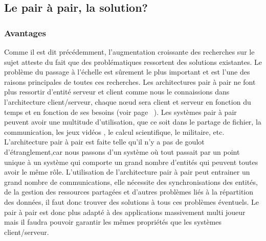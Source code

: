 	\subsection{Le pair à pair, la solution?}
		\subsubsection{Avantages}
	Comme il est dit précédemment, l'augmentation croissante des recherches sur le sujet atteste du fait que des problématiques ressortent des solutions existantes. Le problème du passage à l'échelle est sûrement le plus important et est l'une des raisons principales de toutes ces recherches. Les architectures pair à pair ne font plus ressortir d'entité serveur et client comme nous le connaissions dans l'architecture client/serveur, chaque nœud sera client et serveur en fonction du temps et en fonction de ses besoins (voir page ~\pageref{P2P/ClServ}). Les systèmes pair à pair peuvent avoir une multitude d'utilisation, que ce soit dans le partage de fichier, la communication, les jeux vidéos , le calcul scientifique, le militaire, etc. \\
	L'architecture pair à pair est faite telle qu'il n'y a pas de goulot d'étranglement,car nous passons d'un système où tout passait par un point unique à un système qui comporte un grand nombre d'entités qui peuvent toutes avoir le même rôle. L'utilisation de l'architecture pair à pair peut entrainer un grand nombre de communications, elle nécessite des synchronisations des entités, de la gestion des ressources partagées et d'autres problèmes liés à la répartition des données, il faut donc trouver des solutions à tous ces problèmes éventuels. Le pair à pair est donc plus adapté à des applications massivement multi joueur mais il faudra pouvoir garantir les mêmes propriétés que les systèmes client/serveur. \\
